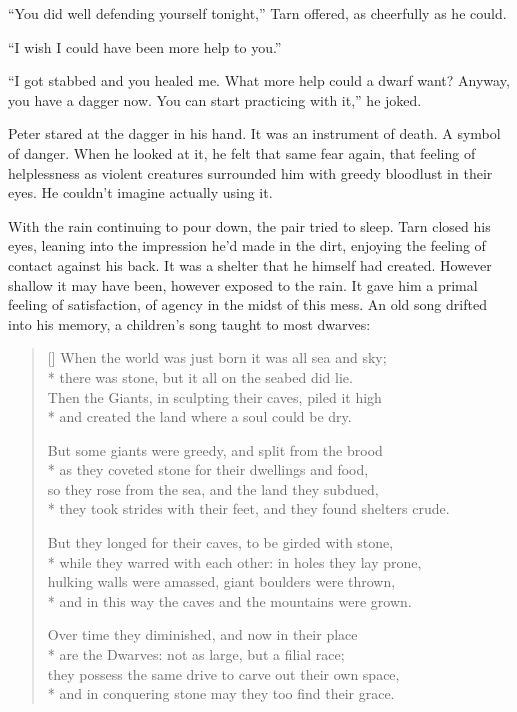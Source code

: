 ``You did well defending yourself tonight,'' Tarn offered, as cheerfully as he could.

``I wish I could have been more help to you.''

``I got stabbed and you healed me.  What more help could a dwarf want?  Anyway, you have a dagger now.  You can start practicing with it,'' he joked.

Peter stared at the dagger in his hand.  It was an instrument of death.  A symbol of danger.  When he looked at it, he felt that same fear again, that feeling of helplessness as violent creatures surrounded him with greedy bloodlust in their eyes.  He couldn't imagine actually using it.

With the rain continuing to pour down, the pair tried to sleep.  Tarn closed his eyes, leaning into the impression he'd made in the dirt, enjoying the feeling of contact against his back.  It was a shelter that he himself had created.  However shallow it may have been, however exposed to the rain.  It gave him a primal feeling of satisfaction, of agency in the midst of this mess.  An old song drifted into his memory, a children's song taught to most dwarves:

\settowidth{\versewidth}{When the world was just born it was all sea and sky;}
\begin{verse}[\versewidth]
When the world was just born it was all sea and sky;\\*
there was stone, but it all on the seabed did lie.\\
Then the Giants, in sculpting their caves, piled it high\\*
and created the land where a soul could be dry.

But some giants were greedy, and split from the brood\\*
as they coveted stone for their dwellings and food,\\
so they rose from the sea, and the land they subdued,\\*
they took strides with their feet, and they found shelters crude.

But they longed for their caves, to be girded with stone,\\*
while they warred with each other: in holes they lay prone,\\
hulking walls were amassed, giant boulders were thrown,\\*
and in this way the caves and the mountains were grown.

Over time they diminished, and now in their place\\*
are the Dwarves: not as large, but a filial race;\\
they possess the same drive to carve out their own space,\\*
and in conquering stone may they too find their grace.
\end{verse}

